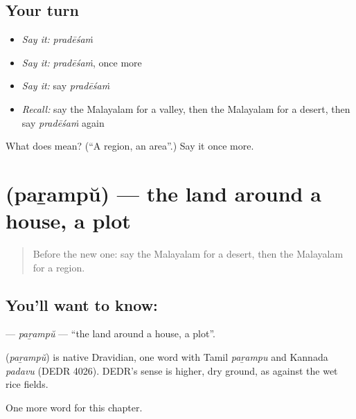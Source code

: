 \subsection*{Your turn}
\begin{itemize}
\raggedright
  \item \emph{Say it:} \emph{pradēśaṁ}
  \item \emph{Say it:} \emph{pradēśaṁ}, once more
  \item \emph{Say it:} say \emph{pradēśaṁ}
  \item \emph{Recall:} say the Malayalam for a valley, then the Malayalam for a desert, then say \emph{pradēśaṁ} again
\end{itemize}

\begin{tcolorbox}[breakable,colback=teal!4,colframe=teal!35!black,title={Before you move on}]
What does  mean? (\textquotedblleft{}A region, an area\textquotedblright{}.) Say it once more.
\end{tcolorbox}
\section[\texorpdfstring{\ml{പറമ്പ്} (paṟampŭ)}{പറമ്പ് (paṟampŭ)}]{ (paṟampŭ) — the land around a house, a plot}

\label{lesson:ML-C280-parampu}



\begin{quote}
Before the new one: say the Malayalam for a desert, then the Malayalam for a region.
\end{quote}

\subsection*{You'll want to know: }
\textbf{} — \emph{paṟampŭ} — \textquotedblleft{}the land around a house, a plot\textquotedblright{}.

\begin{cousinweb}
\textbf{} (\emph{paṟampŭ}) is native Dravidian, one word with Tamil \emph{paṟampu} and Kannada \emph{padavu} (DEDR 4026). DEDR's sense is higher, dry ground, as against the wet rice fields.
\end{cousinweb}

\begin{grammarlens}[title={What you've built}]
One more word for this chapter.
\end{grammarlens}


